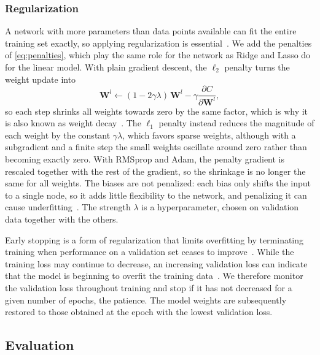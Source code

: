 \subsubsection{Regularization}

A network with more parameters than data points available can fit the entire training set
exactly, so applying regularization is essential~\cite{hjorth-jensen_2026}. We add the
penalties of \cref{eq:penalties}, which play the same role for the network as Ridge and
Lasso do for the linear model. With plain gradient descent, the $\ell_2$ penalty turns the
weight update into
\begin{equation}\label{eq:weight-decay}
    \bm{W}^l \leftarrow (1 - 2\gamma\lambda)\,\bm{W}^l - \gamma\frac{\partial C}{\partial \bm{W}^l},
\end{equation}
so each step shrinks all weights towards zero by the same factor, which is why it is also
known as weight decay~\cite{goodfellow_2016}. The $\ell_1$ penalty instead reduces the
magnitude of each weight by the constant $\gamma\lambda$, which favors sparse weights,
although with a subgradient and a finite step the small weights oscillate around zero
rather than becoming exactly zero. With RMSprop and Adam, the penalty gradient is rescaled
together with the rest of the gradient, so the shrinkage is no longer the same for all
weights. The biases are not penalized: each bias only shifts the input to a single node,
so it adds little flexibility to the network, and penalizing it can cause
underfitting~\cite{goodfellow_2016}. The strength $\lambda$ is a hyperparameter, chosen on
validation data together with the others.

Early stopping is a form of regularization that limits overfitting by
terminating training when performance on a validation set ceases to
improve~\cite{hjorth-jensen_2026}. While the training loss may continue
to decrease, an increasing validation loss can indicate that the model
is beginning to overfit the training data~\cite{geron_2023}. We therefore
monitor the validation loss throughout training and stop if it has not
decreased for a given number of epochs, the patience. The model weights are subsequently
restored to those obtained at the epoch with the lowest validation loss.

\subsection{Evaluation}\label{subsec:evaluation}

